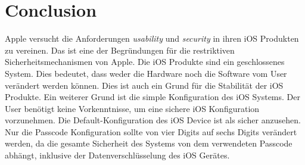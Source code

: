 %
%
%
% 

\chapter{Conclusion}
\label{ch:Conclusion}
Apple versucht die  Anforderungen \textit{\glqq usability\grqq{}} und \textit{\glqq security\grqq{}} in ihren iOS Produkten zu vereinen. Das ist eine der Begründungen für die restriktiven Sicherheitsmechanismen von Apple. Die iOS Produkte sind ein geschlossenes System. Dies bedeutet, dass weder die Hardware noch die Software vom User verändert werden können. Dies ist auch ein Grund für die Stabilität der iOS Produkte. Ein weiterer Grund ist die simple Konfiguration des iOS Systems. Der User benötigt keine Vorkenntnisse, um eine sichere iOS Konfiguration vorzunehmen. Die Default-Konfiguration des iOS Device ist als sicher anzusehen. Nur die Passcode Konfiguration sollte von vier Digits auf sechs Digits verändert werden, da die gesamte Sicherheit des Systems von dem verwendeten Passcode abhängt, inklusive der Datenverschlüsselung des iOS Gerätes. \par 

